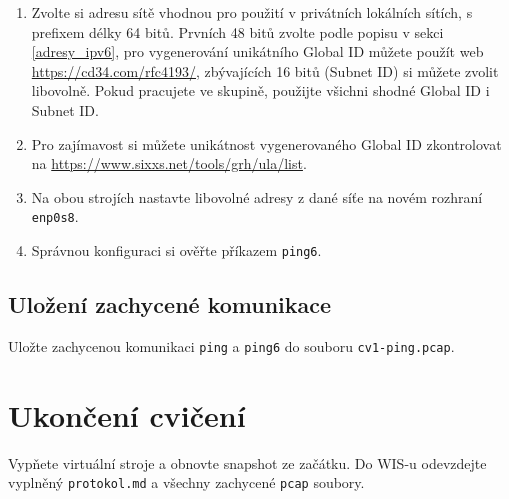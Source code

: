 \begin{enumerate}
    \item Zvolte si adresu sítě vhodnou pro použití v privátních lokálních
        sítích, s prefixem délky 64 bitů. Prvních 48 bitů zvolte podle popisu v
        sekci \ref{adresy_ipv6}, pro vygenerování unikátního Global ID můžete
        použít web \url{https://cd34.com/rfc4193/}, zbývajících 16 bitů (Subnet
        ID) si můžete zvolit libovolně. Pokud pracujete ve skupině, použijte
        všichni shodné Global ID i Subnet ID.
    \item Pro zajímavost si můžete unikátnost vygenerovaného Global ID
        zkontrolovat na \url{https://www.sixxs.net/tools/grh/ula/list}.
    \item Na obou strojích nastavte libovolné adresy z dané síťe na novém rozhraní \texttt{enp0s8}.
    \item Správnou konfiguraci si ověřte příkazem {\tt ping6}.
\end{enumerate}

\subsection*{Uložení zachycené komunikace}
Uložte zachycenou komunikaci \texttt{ping} a \texttt{ping6} do souboru \texttt{cv1-ping.pcap}.

\section{Ukončení cvičení}
Vypňete virtuální stroje a obnovte snapshot ze začátku.
Do WIS-u odevzdejte vyplněný \texttt{protokol.md} a všechny zachycené \texttt{pcap} soubory.
